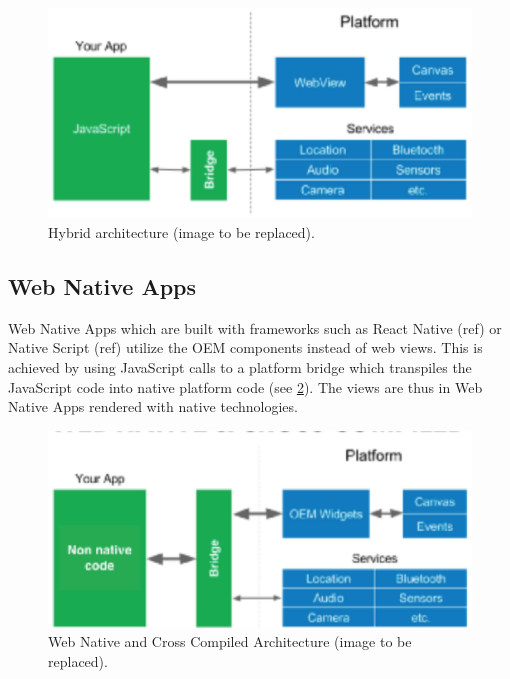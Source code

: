 \begin{figure}
    \includegraphics[width=\linewidth]{images/architectures/hybrid_architecture.eps}
    \caption{Hybrid architecture (image to be replaced).}
    \label{fig:hybrid_architecture}
\end{figure}

\subsection{Web Native Apps}
Web Native Apps which are built with frameworks such as React Native (ref) or Native Script (ref) utilize the OEM components instead of web views.
This is achieved by using JavaScript calls to a platform bridge which transpiles the JavaScript code into native platform code (see \ref{fig:web_native_architecture}). 
The views are thus in Web Native Apps rendered with native technologies.

\begin{figure}
    \includegraphics[width=\linewidth]{images/architectures/native_web_app_architecture.eps}
    \caption{Web Native and Cross Compiled Architecture (image to be replaced).}
    \label{fig:web_native_architecture}
\end{figure}

